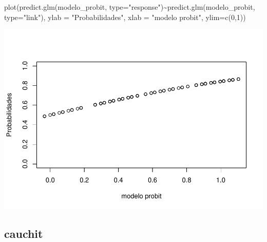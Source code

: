 \documentclass[
]{article}
\newenvironment{Shaded}{\begin{snugshade}}{\end{snugshade}}
\newcommand{\AttributeTok}[1]{\textcolor[rgb]{0.80,0.80,0.80}{#1}}
\newcommand{\DecValTok}[1]{\textcolor[rgb]{0.86,0.86,0.80}{#1}}
\newcommand{\FunctionTok}[1]{\textcolor[rgb]{0.94,0.94,0.56}{#1}}
\newcommand{\NormalTok}[1]{\textcolor[rgb]{0.80,0.80,0.80}{#1}}
\newcommand{\OtherTok}[1]{\textcolor[rgb]{0.94,0.94,0.56}{#1}}
\newcommand{\SpecialCharTok}[1]{\textcolor[rgb]{0.86,0.64,0.64}{#1}}
\newcommand{\StringTok}[1]{\textcolor[rgb]{0.80,0.58,0.58}{#1}}
\begin{document}
\begin{Shaded}
\begin{Highlighting}[]
\FunctionTok{plot}\NormalTok{(}\FunctionTok{predict.glm}\NormalTok{(modelo\_probit, }\AttributeTok{type=}\StringTok{"response"}\NormalTok{)}\SpecialCharTok{\textasciitilde{}}\FunctionTok{predict.glm}\NormalTok{(modelo\_probit, }\AttributeTok{type=}\StringTok{"link"}\NormalTok{),}
     \AttributeTok{ylab =} \StringTok{"Probabilidades"}\NormalTok{,}
     \AttributeTok{xlab =} \StringTok{"modelo probit"}\NormalTok{,}
     \AttributeTok{ylim=}\FunctionTok{c}\NormalTok{(}\DecValTok{0}\NormalTok{,}\DecValTok{1}\NormalTok{))}
\end{Highlighting}
\end{Shaded}

\includegraphics{EDA__files/figure-latex/unnamed-chunk-11-2.pdf}

\hypertarget{cauchit}{%
\subsection{cauchit}\label{cauchit}}

\begin{Shaded}
\end{Shaded}
\end{document}
